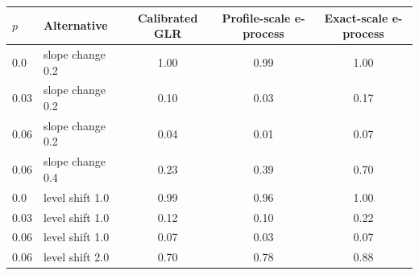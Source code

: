 \begin{tabular}{llccc}
\toprule
$p$ & Alternative & Calibrated GLR & Profile-scale e-process & Exact-scale e-process \\
\midrule
0.0 & slope change 0.2 & 1.00 & 0.99 & 1.00 \\
0.03 & slope change 0.2 & 0.10 & 0.03 & 0.17 \\
0.06 & slope change 0.2 & 0.04 & 0.01 & 0.07 \\
0.06 & slope change 0.4 & 0.23 & 0.39 & 0.70 \\
0.0 & level shift 1.0 & 0.99 & 0.96 & 1.00 \\
0.03 & level shift 1.0 & 0.12 & 0.10 & 0.22 \\
0.06 & level shift 1.0 & 0.07 & 0.03 & 0.07 \\
0.06 & level shift 2.0 & 0.70 & 0.78 & 0.88 \\
\bottomrule
\end{tabular}
